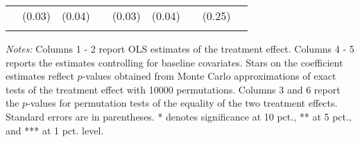 \begin{table}[h]
{\begin{threeparttable}
\begin{tabular}{l*{8}{c}}
          &   (0.03)&   (0.04)&         &   (0.03)&   (0.04)&         &   (0.25)&         \\
          &         &         &         &         &         &         &         &         \\
\bottomrule \end{tabular} \begin{tablenotes}[flushleft] \footnotesize \item \emph{Notes:} Columns 1 - 2 report OLS estimates of the treatment effect. Columns 4 - 5 reports the estimates controlling for baseline covariates. Stars on the coefficient estimates reflect \(p\)-values obtained from Monte Carlo approximations of exact tests of the treatment effect with 10000 permutations. Columns 3 and 6 report the \(p\)-values for permutation tests of the equality of the two treatment effects. Standard errors are in parentheses. * denotes significance at 10 pct., ** at 5 pct., and *** at 1 pct. level. \end{tablenotes} \end{threeparttable} } \end{table}

